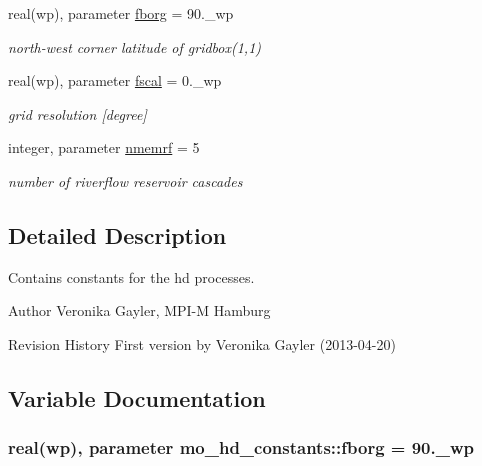 \begin{DoxyCompactItemize}
real(wp), parameter \hyperlink{namespacemo__hd__constants_a7270adbffa37eee2f760d2084fb208ee}{fborg} = 90.\+\_\+wp
\begin{DoxyCompactList}\small\item\em north-\/west corner latitude of gridbox(1,1) \end{DoxyCompactList}\item 
real(wp), parameter \hyperlink{namespacemo__hd__constants_ad75b06fdc814a4a8eefcb76b47760ded}{fscal} = 0.\+\_\+wp
\begin{DoxyCompactList}\small\item\em grid resolution \mbox{[}degree\mbox{]} \end{DoxyCompactList}\item 
integer, parameter \hyperlink{namespacemo__hd__constants_a3f303b1ab15b9bc83ce3cca3beb1bfd0}{nmemrf} = 5
\begin{DoxyCompactList}\small\item\em number of riverflow reservoir cascades \end{DoxyCompactList}\end{DoxyCompactItemize}


\subsection{Detailed Description}
Contains constants for the hd processes. 

\begin{DoxyAuthor}{Author}
Veronika Gayler, M\+P\+I-\/\+M Hamburg
\end{DoxyAuthor}
\begin{DoxyParagraph}{Revision History}
First version by Veronika Gayler (2013-\/04-\/20) 
\end{DoxyParagraph}


\subsection{Variable Documentation}
\hypertarget{namespacemo__hd__constants_a7270adbffa37eee2f760d2084fb208ee}{}
\subsubsection[{fborg}]{\setlength{\rightskip}{0pt plus 5cm}real(wp), parameter mo\+\_\+hd\+\_\+constants\+::fborg = 90.\+\_\+wp}\label{namespacemo__hd__constants_a7270adbffa37eee2f760d2084fb208ee}


